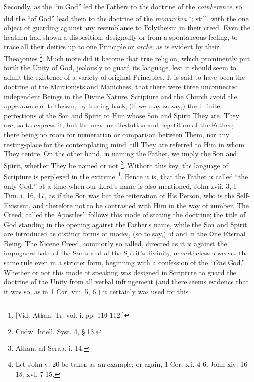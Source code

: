 Secondly, as the ``in God'' led the Fathers to the doctrine
of the \emph{coinherence}, so did the ``of God'' lead them to
the doctrine of the \emph{monarchia} \footnote{[Vid. Athan. Tr. vol. i. pp. 110-112.]}; still, with the one object of guarding against any
resemblance to Polytheism in their creed. Even the heathen had shown a
disposition, designedly or from a spontaneous feeling, to trace all
their deities up to one Principle or \emph{arche}; as is evident by
their Theogonies \footnote{Cudw. Intell. Syst. 4, § 13.}. Much
more did it become that true religion, which prominently put forth the
Unity of God, jealously to guard its language, lest it should seem to
admit the existence of a variety of original Principles. It is said to
have been the doctrine of the Marcionists and Manichees, that there
were three unconnected independent Beings in the Divine Nature.
Scripture and the Church avoid the appearance of tritheism, by tracing
back, (if we may so say,) the infinite perfections of the Son and
Spirit to Him whose Son and Spirit They are. They are, so to express
it, but the new manifestation and repetition of the Father; there
being no room for numeration or comparison between Them, nor any
resting-place for the contemplating mind, till They are referred to
Him in whom They centre. On the other hand, in naming the Father, we
imply the Son and Spirit, whether They be named or not \footnote{Athan. ad Serap. i. 14.}. Without this key, the language of Scripture is perplexed
in the extreme \footnote{Let John v. 20 be taken as an example; or
again, 1 Cor. xii. 4-6. John xiv. 16-18; xvi. 7-15.}.
Hence it is, that the Father is called ``the only God,'' at a
time when our Lord's name is also mentioned, John xvii. 3, 1 Tim. i.
16, 17, as if the Son was but the reiteration of His Person, who is
the Self-Existent, and therefore not to be contrasted with Him in the
way of number. The Creed, called the Apostles', follows this mode of
stating the doctrine; the title of God standing in the opening against
the Father's name, while the Son and Spirit are introduced as distinct
forms or modes, (so to say,) of and in the One Eternal Being. The
Nicene Creed, commonly so called, directed as it is against the
impugners both of the Son's and of the Spirit's divinity, nevertheless
observes the same rule even in a stricter form, beginning with a
confession of the ``\emph{One} God.'' Whether or not this mode
of speaking was designed in Scripture to guard the doctrine of the
Unity from all verbal infringement (and there seems evidence that it
was so, as in 1 Cor. viii. 5, 6,) it certainly was used for this
